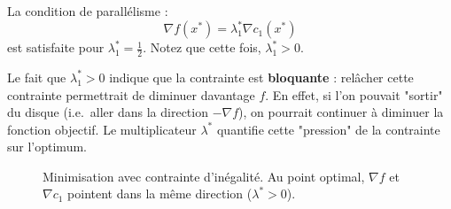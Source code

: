 La condition de parallélisme :
\begin{equation}
    \nabla f(x^*) = \lambda_1^* \nabla c_1(x^*)
\end{equation}
est satisfaite pour $\lambda_1^* = \frac{1}{2}$. Notez que cette fois, $\lambda_1^* > 0$.

\begin{remarque}
Le fait que $\lambda_1^* > 0$ indique que la contrainte est \textbf{bloquante} : relâcher cette contrainte permettrait de diminuer davantage $f$. En effet, si l'on pouvait "sortir" du disque (i.e.\ aller dans la direction $-\nabla f$), on pourrait continuer à diminuer la fonction objectif. Le multiplicateur $\lambda^*$ quantifie cette "pression" de la contrainte sur l'optimum.
\end{remarque}

\begin{figure}[H]
\centering
{}
\caption{Minimisation avec contrainte d'inégalité. Au point optimal, $\nabla f$ et $\nabla c_1$ pointent dans la même direction ($\lambda^* > 0$).}
\label{fig:ex-inequality-constraint}
\end{figure}

